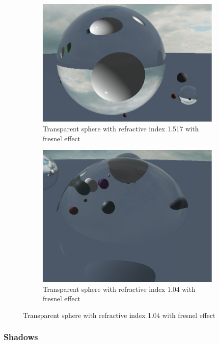 \documentclass[final]{cmpreport}
\begin{document}
\begin{figure}
    \centering
    \begin{subfigure}{0.5\textwidth}
        \centering
        \includegraphics[width=0.9\linewidth]{img/fresnel_solid.png}
        \caption{Transparent sphere with refractive index 1.517 with fresnel effect}
        \label{fresnel_solid}
    \end{subfigure}%
    \begin{subfigure}{0.5\textwidth}
        \centering
        \includegraphics[width=0.9\linewidth]{img/fresnel_hollow.png}
        \caption{Transparent sphere with refractive index 1.04 with fresnel effect}
        \label{fresnel_hollow}
    \end{subfigure}
\end{figure}

\subsubsection{Shadows}
\end{document}

